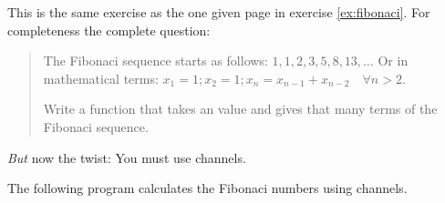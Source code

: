 \begin{Exercise}[title={Fibonaci II},difficulty=7]
\label{ex:fibonaci II}
\Question\label{ex:fibonaci II q1}
This is the same exercise as the one given page \pageref{ex:fibonaci} 
in exercise \ref{ex:fibonaci}. For completeness the complete question:

\begin{quote}
The Fibonaci sequence starts as follows: $1, 1, 2, 3, 5, 8, 13, \ldots$
Or in mathematical terms: $ x_1 = 1; x_2 = 1; x_n = x_{n-1} +
x_{n-2}\quad\forall n > 2 $.

Write a function that takes an  value and gives 
that many terms of the Fibonaci sequence.
\end{quote}
\emph{But} now the twist: You must use channels.

\end{Exercise}

\begin{Answer}
\Question
The following program calculates the Fibonaci numbers using channels.

\end{Answer}


